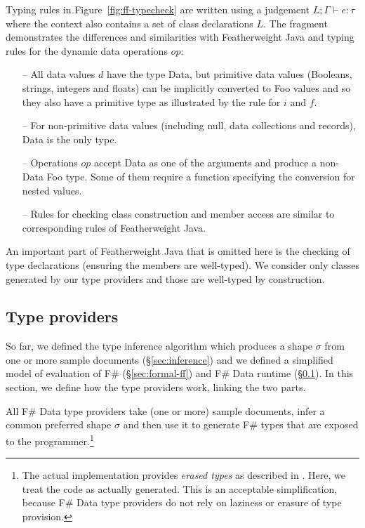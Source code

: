 \documentclass[10pt]{sigplanconf}
\newcommand{\kvd}[1]{\textnormal{\textcolor{kvdclr}{\sffamily #1}}}
\newcommand{\ident}[1]{\textnormal{\sffamily #1}}
\begin{document}
Typing rules in Figure~\ref{fig:ff-typecheck} are written using a judgement
$L; \Gamma \vdash e : \tau$ where the context also contains a set of class declarations $L$.
The fragment demonstrates the differences and similarities with Featherweight Java \cite{fwjava} and
typing rules for the dynamic data operations $op$:
%
\begin{itemize}
\item[--] All data values $d$ have the type \ident{Data}, but primitive data values (Booleans,
  strings, integers and floats) can be implicitly converted to Foo values and so they also have a
  primitive type as illustrated by the rule for $i$ and $f$.

\item[--] For non-primitive data values (including \kvd{null}, data collections and records),
  \ident{Data} is the only type.

\item[--] Operations $op$ accept \ident{Data} as one of the arguments and produce a non-\ident{Data}
  Foo type. Some of them require a function specifying the conversion for nested values.

\item[--] Rules for checking class construction and member access are similar to corresponding
  rules of Featherweight Java.
\end{itemize}
%
An important part of Featherweight Java that is omitted here is the checking of type declarations
(ensuring the members are well-typed). We consider only classes generated by our type providers
and those are well-typed by construction.


\subsection{Type providers}
\label{sec:formal-tp}

So far, we defined the type inference algorithm which produces a shape $\sigma$ from one
or more sample documents (\S\ref{sec:inference}) and we defined a simplified model of evaluation
of F\# (\S\ref{sec:formal-ff}) and F\# Data runtime (\S\ref{sec:formal-tp}). In this section, we
define how the type providers work, linking the two parts.

All F\# Data type providers take (one or more) sample documents, infer a common preferred shape $\sigma$
and then use it to generate F\# types that are exposed to the programmer.\footnote{The actual
implementation provides \emph{erased types} as described in \cite{fsharp-typeprov}. Here, we treat
the code as actually generated. This is an acceptable simplification, because F\# Data type providers
do not rely on laziness or erasure of type provision.}
\end{document}
